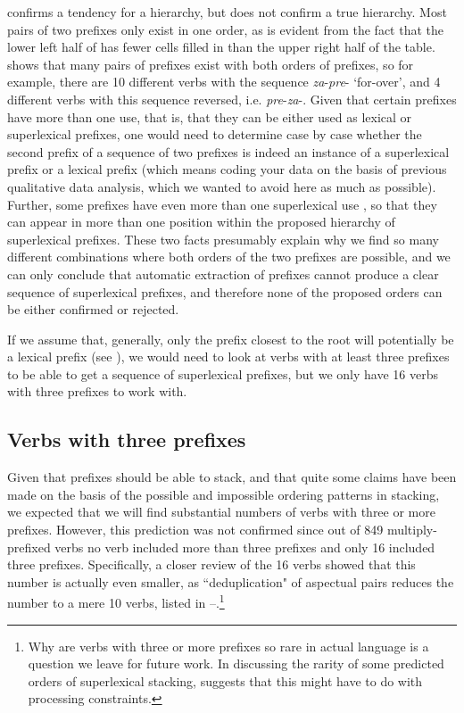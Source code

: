 \documentclass[output=paper,colorlinks,citecolor=brown]{langscibook}
\begin{document}
 confirms a tendency for a hierarchy, but does not confirm a true hierarchy. Most pairs of two prefixes only exist in one order, as is evident from the fact that the lower left half of  has fewer cells filled in than the upper right half of the table.   shows that many pairs of prefixes exist with both orders of prefixes, so for example, there are 10 different verbs with the sequence \textit{za}-\textit{pre}- `for-over', and 4 different verbs with this sequence reversed, i.e. \textit{pre}-\textit{za}-. Given that certain prefixes have more than one use, that is, that they can be either used as lexical or superlexical prefixes, one would need to determine case by case whether the second prefix of a sequence of two prefixes is indeed an instance of a superlexical prefix or a lexical prefix (which means coding your data on the basis of previous qualitative data analysis, which we wanted to avoid here as much as possible). Further, some prefixes have even more than one superlexical use \citep[cf.][]{wiland2012prefix,KlimekJankowskaBlaszczak2022}, so that they can appear in more than one position within the proposed hierarchy of superlexical prefixes. These two facts presumably explain why we find so many different combinations where both orders of the two prefixes are possible, and we can only conclude that automatic extraction of prefixes cannot produce a clear sequence of superlexical prefixes, and therefore none of the proposed orders can be either confirmed or rejected. 

If we assume that, generally, only the prefix closest to the root will potentially be a lexical prefix (see ), we would need to look at verbs with at least three prefixes to be able to get a sequence of superlexical prefixes, but we only have 16 verbs with three prefixes to work with.
    

\subsection{Verbs with three prefixes}\label{sec:3prefixes}
Given that prefixes should be able to stack, and that quite some claims have been made on the basis of the possible and impossible ordering patterns in stacking, we expected that we will find substantial numbers of verbs with three or more prefixes. However, this prediction was not confirmed since out of 849 multiply-prefixed verbs no verb included more than three prefixes and only 16 included three prefixes. Specifically, a closer review of the 16 verbs showed that this number is actually even smaller, as ``deduplication" of aspectual pairs reduces the number to a mere 10 verbs, listed in --.\footnote{Why are verbs with three or more prefixes so rare in actual language is a question we leave for future work. In discussing the rarity of some predicted orders of superlexical stacking, \citet[269]{markova2011nature} suggests that this might have to do with processing constraints.}
\end{document}

